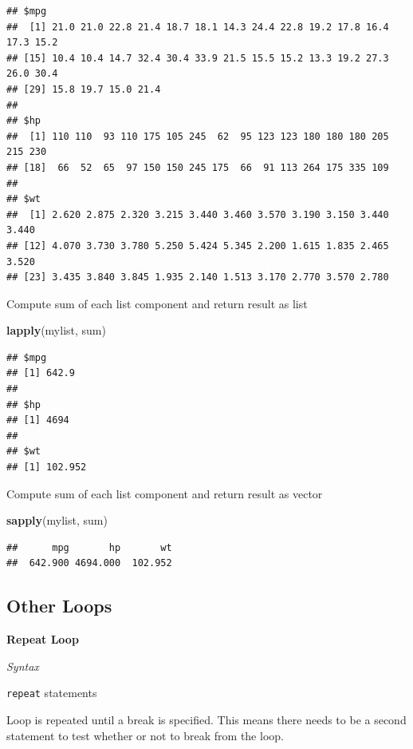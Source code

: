 \documentclass[]{article}
\newenvironment{Shaded}{\begin{snugshade}}{\end{snugshade}}
\newcommand{\KeywordTok}[1]{\textcolor[rgb]{0.13,0.29,0.53}{\textbf{{#1}}}}
\newcommand{\NormalTok}[1]{{#1}}
\numberwithin{equation}{section}
\begin{document}
\begin{verbatim}
## $mpg
##  [1] 21.0 21.0 22.8 21.4 18.7 18.1 14.3 24.4 22.8 19.2 17.8 16.4 17.3 15.2
## [15] 10.4 10.4 14.7 32.4 30.4 33.9 21.5 15.5 15.2 13.3 19.2 27.3 26.0 30.4
## [29] 15.8 19.7 15.0 21.4
## 
## $hp
##  [1] 110 110  93 110 175 105 245  62  95 123 123 180 180 180 205 215 230
## [18]  66  52  65  97 150 150 245 175  66  91 113 264 175 335 109
## 
## $wt
##  [1] 2.620 2.875 2.320 3.215 3.440 3.460 3.570 3.190 3.150 3.440 3.440
## [12] 4.070 3.730 3.780 5.250 5.424 5.345 2.200 1.615 1.835 2.465 3.520
## [23] 3.435 3.840 3.845 1.935 2.140 1.513 3.170 2.770 3.570 2.780
\end{verbatim}

Compute sum of each list component and return result as list

\begin{Shaded}
\begin{Highlighting}[]
\KeywordTok{lapply}\NormalTok{(mylist, sum)}
\end{Highlighting}
\end{Shaded}

\begin{verbatim}
## $mpg
## [1] 642.9
## 
## $hp
## [1] 4694
## 
## $wt
## [1] 102.952
\end{verbatim}

Compute sum of each list component and return result as vector

\begin{Shaded}
\begin{Highlighting}[]
\KeywordTok{sapply}\NormalTok{(mylist, sum)}
\end{Highlighting}
\end{Shaded}

\begin{verbatim}
##      mpg       hp       wt 
##  642.900 4694.000  102.952
\end{verbatim}

\subsection{Other Loops}\label{other-loops}

\textbf{Repeat Loop}

\emph{Syntax}

\texttt{repeat} statements

Loop is repeated until a break is specified. This means there needs to
be a second statement to test whether or not to break from the loop.
\end{document}
